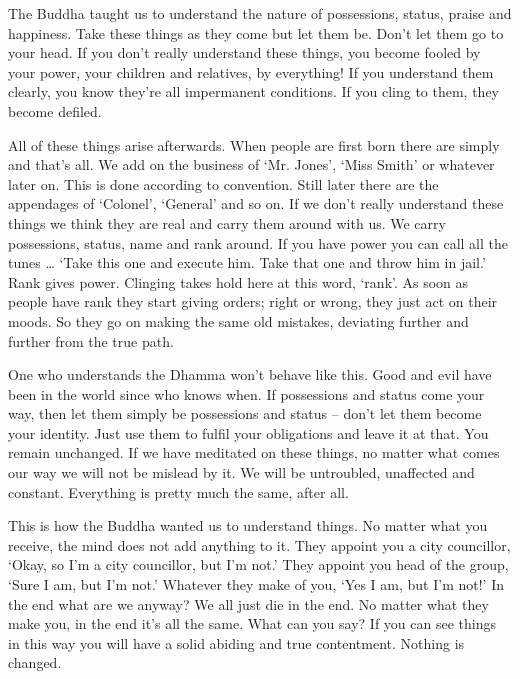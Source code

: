 The Buddha taught us to understand the nature of possessions, status, praise and happiness. Take these things as they come but let them be. Don't let them go to your head. If you don't really understand these things, you become fooled by your power, your children and relatives, by everything! If you understand them clearly, you know they're all impermanent conditions. If you cling to them, they become defiled.

All of these things arise afterwards. When people are first born there are simply  and  that's all. We add on the business of `Mr. Jones', `Miss Smith' or whatever later on. This is done according to convention. Still later there are the appendages of `Colonel', `General' and so on. If we don't really understand these things we think they are real and carry them around with us. We carry possessions, status, name and rank around. If you have power you can call all the tunes \ldots{} `Take this one and execute him. Take that one and throw him in jail.' Rank gives power. Clinging takes hold here at this word, `rank'. As soon as people have rank they start giving orders; right or wrong, they just act on their moods. So they go on making the same old mistakes, deviating further and further from the true path.

One who understands the Dhamma won't behave like this. Good and evil have been in the world since who knows when. If possessions and status come your way, then let them simply be possessions and status -- don't let them become your identity. Just use them to fulfil your obligations and leave it at that. You remain unchanged. If we have meditated on these things, no matter what comes our way we will not be mislead by it. We will be untroubled, unaffected and constant. Everything is pretty much the same, after all.

This is how the Buddha wanted us to understand things. No matter what you receive, the mind does not add anything to it. They appoint you a city councillor, `Okay, so I'm a city councillor, but I'm not.' They appoint you head of the group, `Sure I am, but I'm not.' Whatever they make of you, `Yes I am, but I'm not!' In the end what are we anyway? We all just die in the end. No matter what they make you, in the end it's all the same. What can you say? If you can see things in this way you will have a solid abiding and true contentment. Nothing is changed.

